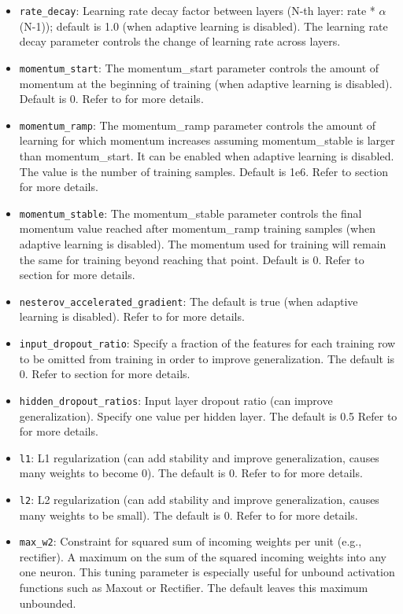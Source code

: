 \documentclass{article}[11pt]
\begin{document}
\begin{itemize}
\item \texttt{rate\_decay}: Learning rate decay factor between layers (N-th layer: rate * $\alpha$ (N-1)); default is 1.0 (when adaptive learning is disabled). The learning rate decay parameter controls the change of learning rate across layers.
\item \texttt{momentum\_start}: The momentum\_start parameter controls the amount of momentum at the beginning of training (when adaptive learning is disabled). Default is 0. Refer to  for more details.
\item \texttt{momentum\_ramp}: The momentum\_ramp parameter controls the amount of learning for which momentum increases assuming momentum\_stable is larger than momentum\_start. It can be enabled when adaptive learning is disabled. The value is the number of training samples. Default is 1e6. Refer to section  for more details.
\item \texttt{momentum\_stable}: The momentum\_stable parameter controls the final momentum value reached after momentum\_ramp training samples (when adaptive learning is disabled). The momentum used for training will remain the same for training beyond reaching that point. Default is 0.  Refer to section  for more details.
\item \texttt{nesterov\_accelerated\_gradient}: The default is true (when adaptive learning is disabled). Refer to  for more details.
\item \texttt{input\_dropout\_ratio}: Specify a fraction of the features for each training row to be omitted from training in order to improve generalization. The default is 0.  Refer to section  for more details.
\item \texttt{hidden\_dropout\_ratios}:  Input layer dropout ratio (can improve generalization). Specify one value per hidden layer. The default is 0.5 Refer to   for more details.
\item \texttt{l1}: L1 regularization (can add stability and improve generalization, causes many weights to become 0). The default is 0. Refer to  for more details.
\item \texttt{l2}: L2 regularization (can add stability and improve generalization, causes many weights to be small). The default is 0. Refer to   for more details.
\item \texttt{max\_w2}: Constraint for squared sum of incoming weights per unit (e.g., rectifier). A maximum on the sum of the squared incoming weights into any one neuron. This tuning parameter is especially useful for unbound activation functions such as Maxout or Rectifier. The default leaves this maximum unbounded.

\end{itemize}
\end{document}
